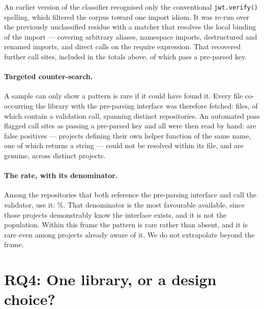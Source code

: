 \documentclass[pdflatex,sn-basic,twocolumn]{sn-jnl}%
\begin{document}
An earlier version of the classifier recognised only the conventional
\texttt{jwt.verify()} spelling, which filtered the corpus toward one import
idiom. It was re-run over the previously unclassified residue with a matcher that
resolves the local binding of the import --- covering arbitrary aliases,
namespace imports, destructured and renamed imports, and direct calls on the
require expression. That recovered \SampleRematchAdded{} further call sites,
included in the totals above, of which \RematchSitesPreparsed{} pass a pre-parsed
key.

\paragraph{Targeted counter-search.} A sample can only show a pattern is rare if
it could have found it. Every file co-occurring the library with the pre-parsing
interface was therefore fetched: \CounterFilesFetched{} files, of which
\CounterWithVerify{} contain a validation call, spanning
\CounterReposWithVerify{} distinct repositories. An automated pass flagged
\AdjudicatedTotal{} call sites as passing a pre-parsed key and all were then read
by hand: \AdjudicatedFalsePositive{} are false positives --- projects defining
their own helper function of the same name, one of which returns a string ---
\AdjudicatedUnresolved{} could not be resolved within its file, and
\AdjudicatedGenuine{} are genuine, across \AdjudicatedGenuineProjects{} distinct
projects.

\paragraph{The rate, with its denominator.} Among the \CounterReposWithVerify{}
repositories that both reference the pre-parsing interface and call the
validator, \AdjudicatedGenuineProjects{} use it: \AdjudicatedGenuinePct\%. That
denominator is the most favourable available, since those projects demonstrably
know the interface exists, and it is not the population. Within this frame the
pattern is rare rather than absent, and it is rare even among projects already
aware of it. We do not extrapolate beyond the frame.

\section{RQ4: One library, or a design choice?}\label{sec:rq4}
\end{document}
